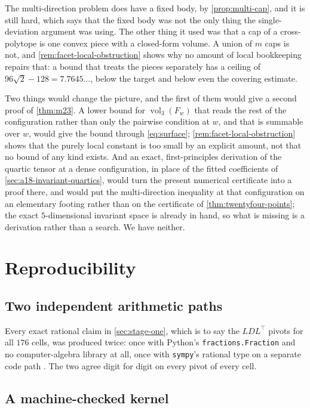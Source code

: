 \documentclass[11pt,reqno]{amsart}
\renewcommand{\_}{\origunderscore\allowbreak}
\numberwithin{equation}{section}
\theoremstyle{plain}
\theoremstyle{definition}
\theoremstyle{remark}
\DeclareMathOperator{\vol}{vol}
\begin{document}
The multi-direction problem does have a fixed body, by
\cref{prop:multi-cap}, and it is still hard, which says that the fixed
body was not the only thing the single-deviation argument was using. The
other thing it used was that a cap of a cross-polytope is one convex
piece with a closed-form volume. A union of $m$ caps is not, and
\cref{rem:facet-local-obstruction} shows why no amount of local
bookkeeping repairs that: a bound that treats the pieces separately has a
ceiling of $96\sqrt2-128=7.7645\ldots$, below the target and below even
the covering estimate.

Two things would change the picture, and the first of them would give
a second proof of \cref{thm:m23}. A lower bound for
$\vol_3(F_w)$ that reads the rest of the configuration rather than only
the pairwise condition at $w$, and that is summable over $w$, would give
the bound through \eqref{eq:surface};
\cref{rem:facet-local-obstruction} shows that the purely local constant
is too small by an explicit amount, not that no bound of any kind
exists. And an exact, first-principles derivation of the quartic tensor
at a dense configuration, in place of the fitted coefficients of
\cref{sec:a18-invariant-quartics}, would turn the present numerical
certificate into a proof there, and would put the multi-direction
inequality at that configuration on an elementary footing rather than on
the certificate of \cref{thm:twentyfour-points}; the exact
$5$-dimensional invariant space is already in
hand, so what is missing is a derivation rather than a search. We have
neither.
\section{Reproducibility}\label{sec:reproducibility-new}

\subsection{Two independent arithmetic paths}

Every exact rational claim in \cref{sec:stage-one}, which is to say the
$LDL^\top$ pivots for all $176$ cells, was produced twice: once with
Python's \texttt{fractions.Fraction} and no computer-algebra library at
all, once with \texttt{sympy}'s rational type on a separate code path
\cite{Meu17}. The two agree digit for digit on every pivot of every
cell.

\subsection{A machine-checked kernel}
\end{document}

